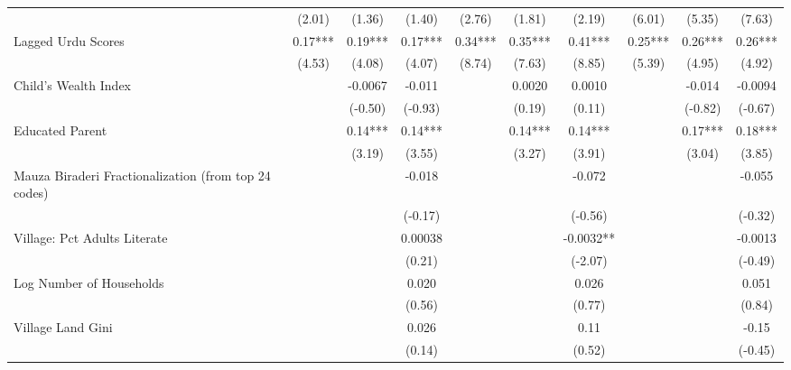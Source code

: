 \begin{sidewaystable}[htbp]
\begin{tabular}{l*{9}{c}}
                &   (2.01)   &   (1.36)   &   (1.40)   &   (2.76)   &   (1.81)   &   (2.19)   &   (6.01)   &   (5.35)   &   (7.63)   \\
Lagged Urdu Scores&     0.17***&     0.19***&     0.17***&     0.34***&     0.35***&     0.41***&     0.25***&     0.26***&     0.26***\\
                &   (4.53)   &   (4.08)   &   (4.07)   &   (8.74)   &   (7.63)   &   (8.85)   &   (5.39)   &   (4.95)   &   (4.92)   \\
Child's Wealth Index&            &  -0.0067   &   -0.011   &            &   0.0020   &   0.0010   &            &   -0.014   &  -0.0094   \\
                &            &  (-0.50)   &  (-0.93)   &            &   (0.19)   &   (0.11)   &            &  (-0.82)   &  (-0.67)   \\
Educated Parent &            &     0.14***&     0.14***&            &     0.14***&     0.14***&            &     0.17***&     0.18***\\
                &            &   (3.19)   &   (3.55)   &            &   (3.27)   &   (3.91)   &            &   (3.04)   &   (3.85)   \\
Mauza Biraderi Fractionalization (from top 24 codes)&            &            &   -0.018   &            &            &   -0.072   &            &            &   -0.055   \\
                &            &            &  (-0.17)   &            &            &  (-0.56)   &            &            &  (-0.32)   \\
Village: Pct Adults Literate&            &            &  0.00038   &            &            &  -0.0032** &            &            &  -0.0013   \\
                &            &            &   (0.21)   &            &            &  (-2.07)   &            &            &  (-0.49)   \\
Log Number of Households&            &            &    0.020   &            &            &    0.026   &            &            &    0.051   \\
                &            &            &   (0.56)   &            &            &   (0.77)   &            &            &   (0.84)   \\
Village Land Gini&            &            &    0.026   &            &            &     0.11   &            &            &    -0.15   \\
                &            &            &   (0.14)   &            &            &   (0.52)   &            &            &  (-0.45)   \\

\end{tabular}
\end{sidewaystable}

